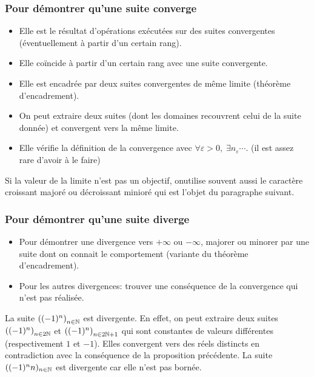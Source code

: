 \subsubsection{Pour démontrer qu'une suite converge}
\begin{itemize}
 \item Elle est le résultat d'opérations exécutées sur des suites convergentes (éventuellement à partir d'un certain rang).
 \item Elle coïncide à partir d'un certain rang avec une suite convergente.
 \item Elle est encadrée par deux suites convergentes de même limite (théorème d'encadrement).
 \item On peut extraire deux suites (dont les domaines recouvrent celui de la suite donnée) et convergent vers la même limite.
 \item Elle vérifie la définition de la convergence avec $\forall \varepsilon > 0,\; \exists n_\varepsilon \cdots$. (il est assez rare d'avoir à le faire)
\end{itemize}
Si la valeur de la limite n'est pas un objectif, onutilise souvent aussi le caractère croissant majoré ou décroissant minioré qui est l'objet du paragraphe suivant.
\subsubsection{Pour démontrer qu'une suite diverge}
\begin{itemize}
  \item Pour démontrer une divergence vers $+\infty$ ou $-\infty$, majorer ou minorer par une suite dont on connait le comportement (variante du théorème d'encadrement).
  \item Pour les autres divergences: trouver une conséquence de la convergence qui n'est pas réalisée.
\end{itemize}
\begin{exples}
 La suite $\left((-1)^n \right)_{n\in\mathbb{N}}$ est divergente.\newline
 En effet, on peut extraire deux suites $\left((-1)^n \right)_{n\in 2\mathbb{N}}$ et $\left((-1)^n \right)_{n\in 2\mathbb{N}+1}$ qui sont constantes de valeurs différentes (respectivement $1$ et $-1$). Elles convergent vers des réels distincts en contradiction avec la conséquence de la proposition précédente.\newline 
 La suite $((-1)^n n)_{n\in\mathbb{N}}$ est divergente car elle n'est pas bornée.
\end{exples}


